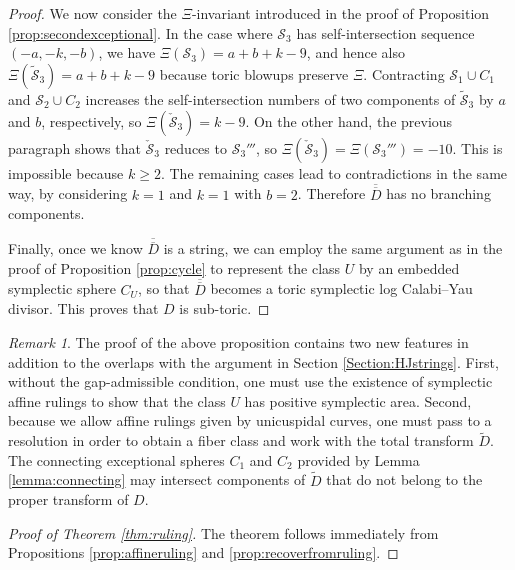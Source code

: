 \documentclass[11pt]{article}
\theoremstyle{definition}
\theoremstyle{remark}
\newtheorem{remark}[theorem]{Remark}
\newcommand{\st}{\mathcal{S}}
\begin{document}
\begin{proof}
We now consider the $\Xi$-invariant introduced in the proof of Proposition \ref{prop:secondexceptional}. In the case where $\st_3$ has self-intersection sequence $(-a,-k,-b)$, we have $\Xi(\st_3)=a+b+k-9$, and hence also $\Xi(\tilde{\st}_3)=a+b+k-9$ because toric blowups preserve $\Xi$. Contracting $\st_1\cup C_1$ and $\st_2\cup C_2$ increases the self-intersection numbers of two components of $\tilde{\st}_3$ by $a$ and $b$, respectively, so $\Xi(\check{\st}_3)=k-9$. On the other hand, the previous paragraph shows that $\check{\st}_3$ reduces to $\st_3'''$, so $\Xi(\check{\st}_3)=\Xi(\st_3''')=-10$. This is impossible because $k\ge 2$. The remaining cases lead to contradictions in the same way, by considering $k=1$ and $k=1$ with $b=2$. Therefore $\overline{\overline{D}}$ has no branching components.
  
Finally, once we know $\overline{\overline{D}}$ is a string, we can employ the same argument as in the proof of Proposition \ref{prop:cycle} to represent the class $U$ by an embedded symplectic sphere $C_U$, so that $\overline{\overline{D}}$ becomes a toric symplectic log Calabi--Yau divisor. This proves that $D$ is sub-toric.
\end{proof}

\begin{remark}
The proof of the above proposition contains two new features in addition to the overlaps with the argument in Section \ref{Section:HJstrings}. First, without the gap-admissible condition, one must use the existence of symplectic affine rulings to show that the class $U$ has positive symplectic area. Second, because we allow affine rulings given by unicuspidal curves, one must pass to a resolution in order to obtain a fiber class and work with the total transform $\tilde{D}$. The connecting exceptional spheres $C_1$ and $C_2$ provided by Lemma \ref{lemma:connecting} may intersect components of $\tilde{D}$ that do not belong to the proper transform of $D$.
\end{remark}

\begin{proof}[Proof of Theorem \ref{thm:ruling}]
  The theorem follows immediately from Propositions \ref{prop:affineruling} and \ref{prop:recoverfromruling}.
\end{proof}



\end{document}
